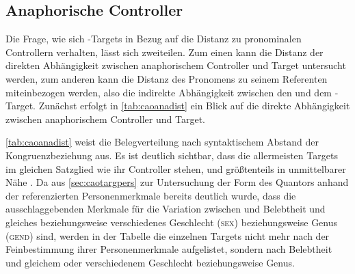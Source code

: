 \subsection{Anaphorische Controller}
\label{subsec:caodistanactrl}

Die Frage, wie sich -Targets in Bezug auf die Distanz zu
pronominalen Controllern verhalten, lässt sich zweiteilen. Zum einen kann die
Distanz der direkten Abhängigkeit zwischen anaphorischem Controller und Target
untersucht werden, zum anderen kann die Distanz des Pronomens zu seinem
Referenten miteinbezogen werden, also die indirekte Abhängigkeit zwischen den
 und dem -Target. Zunächst erfolgt in
\cref{tab:caoanadist} ein Blick auf die direkte Abhängigkeit zwischen
anaphorischem Controller und Target.

\cref{tab:caoanadist} weist die Belegverteilung nach syntaktischem Abstand der
Kongruenzbeziehung aus. Es ist deutlich sichtbar, dass die allermeisten Targets
im gleichen Satzglied wie ihr Controller stehen, und größtenteils in
unmittelbarer Nähe \autocite[vgl.][526--527]{ksw2}. Da aus
\cref{sec:caotargpers} zur Untersuchung der Form des Quantors 
anhand der referenzierten Personenmerkmale bereits deutlich wurde, dass die
ausschlaggebenden Merkmale für die Variation zwischen  und
 Belebtheit und gleiches beziehungsweise verschiedenes Geschlecht
(\textsc{sex}) beziehungsweise Genus (\textsc{gend}) sind, werden in der Tabelle die einzelnen
Targets nicht mehr nach der Feinbestimmung ihrer Personenmerkmale aufgelistet,
sondern nach Belebtheit und gleichem oder verschiedenem Geschlecht
beziehungsweise Genus.

